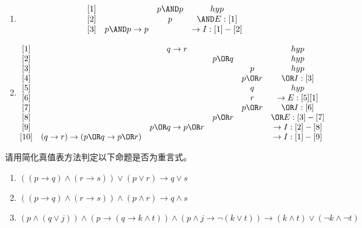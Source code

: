 \documentclass{ctexart}
\begin{document}
\begin{solution}
  \begin{enumerate}
    \item \[
        \begin{matrix}
          [1] &                & p \AND p & hyp           \\
          [2] &                & p        & \AND E:[1]    \\
          [3] & p \AND p \to p &          & \to I:[1]-[2] \\
        \end{matrix}
      \]
    \item \[
        \begin{matrix}
          [1]  &                                   & q \to r             &         &         & hyp           \\
          [2]  &                                   &                     & p \OR q &         & hyp           \\
          [3]  &                                   &                     &         & p       & hyp           \\
          [4]  &                                   &                     &         & p \OR r & \OR I:[3]     \\
          [5]  &                                   &                     &         & q       & hyp           \\
          [6]  &                                   &                     &         & r       & \to E:[5][1]  \\
          [7]  &                                   &                     &         & p \OR r & \OR I:[6]     \\
          [8]  &                                   &                     & p \OR r &         & \OR E:[3]-[7] \\
          [9]  &                                   & p \OR q \to p \OR r &         &         & \to I:[2]-[8] \\
          [10] & (q \to r)\to(p \OR q \to p \OR r) &                     &         &         & \to I:[1]-[9] \\
        \end{matrix}
      \]
  \end{enumerate}

\end{solution}
\begin{problem}\label{pro:6}
  请用简化真值表方法判定以下命题是否为重言式。
  \begin{enumerate}
    \item $((p \to q) \wedge(r \to s)) \vee(p \vee r) \to q \vee s$
    \item $((p \to q) \wedge(r \to s)) \wedge(p \wedge r) \to q \wedge s$
    \item $(p \wedge(q \vee j)) \wedge(p \to(q \to k \wedge t)) \wedge(p \wedge j \to \neg(k \vee t)) \to(k \wedge t) \vee(\neg k \wedge \neg t)$
  \end{enumerate}
\end{problem}
\end{document}
